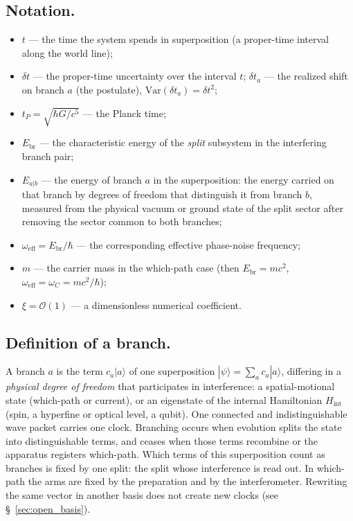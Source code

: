 \documentclass[11pt,a4paper]{article}
\begin{document}
\subsection{Notation.}
\begin{itemize}
\item $t$ --- the time the system spends in superposition (a proper-time interval along the world line);
\item $\delta t$ --- the proper-time uncertainty over the interval $t$; $\delta t_a$ --- the realized shift on branch $a$ (the postulate), $\mathrm{Var}(\delta t_a)=\delta t^2$;
\item $t_P=\sqrt{\hbar G/c^5}$ --- the Planck time;
\item $E_{\mathrm{br}}$ --- the characteristic energy of the \emph{split} subsystem in the interfering branch pair;
\item $E_{a|b}$ --- the energy of branch $a$ in the superposition: the energy carried on that branch by degrees of freedom that distinguish it from branch $b$, measured from the physical vacuum or ground state of the split sector after removing the sector common to both branches;
\item $\omega_{\mathrm{eff}}=E_{\mathrm{br}}/\hbar$ --- the corresponding effective phase-noise frequency;
\item $m$ --- the carrier mass in the which-path case (then $E_{\mathrm{br}}=mc^2$, $\omega_{\mathrm{eff}}=\omega_C=mc^2/\hbar$);
\item $\xi=\mathcal O(1)$ --- a dimensionless numerical coefficient.
\end{itemize}

\subsection{Definition of a branch.}
\label{sec:branch_def}
A branch $a$ is the term $c_a|a\rangle$ of one superposition $|\psi\rangle=\sum_a c_a|a\rangle$, differing in a \emph{physical degree of freedom} that participates in interference: a spatial-motional state (which-path or current), or an eigenstate of the internal Hamiltonian $H_{\mathrm{int}}$ (spin, a hyperfine or optical level, a qubit). One connected and indistinguishable wave packet carries one clock. Branching occurs when evolution splits the state into distinguishable terms, and ceases when those terms recombine or the apparatus registers which-path. Which terms of this superposition count as branches is fixed by one split: the split whose interference is read out. In which-path the arms are fixed by the preparation and by the interferometer. Rewriting the same vector in another basis does not create new clocks (see \S~\ref{sec:open_basis}).
\end{document}
